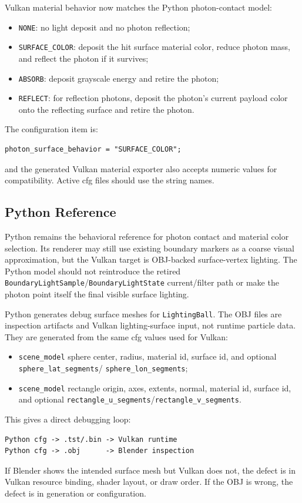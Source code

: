 Vulkan material behavior now matches the Python photon-contact model:
\begin{itemize}
    \item \texttt{NONE}: no light deposit and no photon reflection;
    \item \texttt{SURFACE\_COLOR}: deposit the hit surface material color,
          reduce photon mass, and reflect the photon if it survives;
    \item \texttt{ABSORB}: deposit grayscale energy and retire the photon;
    \item \texttt{REFLECT}: for reflection photons, deposit the photon's
          current payload color onto the reflecting surface and retire the
          photon.
\end{itemize}

The configuration item is:
\begin{verbatim}
photon_surface_behavior = "SURFACE_COLOR";
\end{verbatim}
and the generated Vulkan material exporter also accepts numeric values for
compatibility.  Active cfg files should use the string names.

\subsection{Python Reference}

Python remains the behavioral reference for photon contact and material color
selection.  Its renderer may still use existing boundary markers as a coarse
visual approximation, but the Vulkan target is OBJ-backed surface-vertex
lighting.  The Python model should not reintroduce the retired
\texttt{BoundaryLightSample}/\texttt{BoundaryLightState} current/filter path or
make the photon point itself the final visible surface lighting.

Python generates debug surface meshes for \texttt{LightingBall}.  The OBJ
files are inspection artifacts and Vulkan lighting-surface input, not runtime
particle data.  They are generated from the same cfg values used for Vulkan:
\begin{itemize}
    \item \texttt{scene\_model} sphere center, radius, material id, surface
          id, and optional \texttt{sphere\_lat\_segments}/
          \texttt{sphere\_lon\_segments};
    \item \texttt{scene\_model} rectangle origin, axes, extents, normal,
          material id, surface id, and optional
          \texttt{rectangle\_u\_segments}/\texttt{rectangle\_v\_segments}.
\end{itemize}
This gives a direct debugging loop:
\begin{verbatim}
Python cfg -> .tst/.bin -> Vulkan runtime
Python cfg -> .obj      -> Blender inspection
\end{verbatim}
If Blender shows the intended surface mesh but Vulkan does not, the defect is
in Vulkan resource binding, shader layout, or draw order.  If the OBJ is
wrong, the defect is in generation or configuration.

